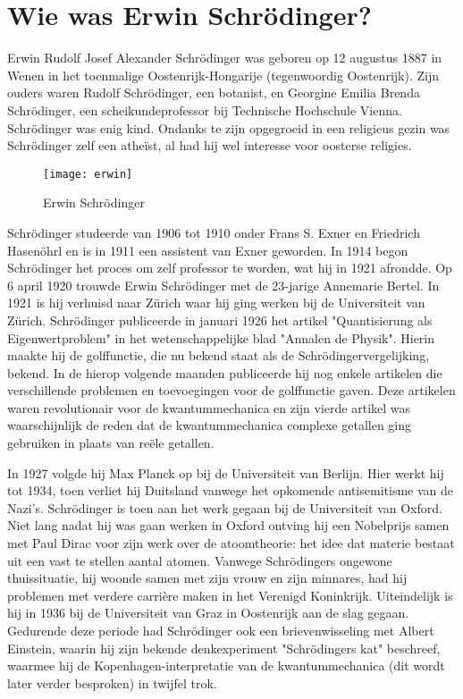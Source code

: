 \documentclass[11pt,fleqn]{book} %
\begin{document}
\section{Wie was Erwin Schrödinger?}
Erwin Rudolf Josef Alexander Schrödinger was geboren op 12 augustus 1887 in Wenen in het toenmalige Oostenrijk-Hongarije (tegenwoordig Oostenrijk). Zijn ouders waren Rudolf Schrödinger, een botanist, en Georgine Emilia Brenda Schrödinger, een scheikundeprofessor bij Technische Hochschule Vienna. Schrödinger was enig kind. Ondanks te zijn opgegroeid in een religieus gezin was Schrödinger zelf een atheïst, al had hij wel interesse voor oosterse religies.
\begin{figure}[h]
	\centering\texttt{[image: erwin]}
	\caption{Erwin Schrödinger}
	\label{fig:erwin}
\end{figure}
Schrödinger studeerde van 1906 tot 1910 onder Frans S. Exner en Friedrich Hasenöhrl en is in 1911 een assistent van Exner geworden. In 1914 begon Schrödinger het proces om zelf professor te worden, wat hij in 1921 afrondde. Op 6 april 1920 trouwde Erwin Schrödinger met de 23-jarige Annemarie Bertel. In 1921 is hij verhuisd naar Zürich waar hij ging werken bij de Universiteit van Zürich. 
Schrödinger publiceerde in januari 1926 het artikel "Quantisierung als Eigenwertproblem" in het wetenschappelijke blad "Annalen de Physik". Hierin maakte hij de golffunctie, die nu bekend staat als de Schrödingervergelijking, bekend. In de hierop volgende maanden publiceerde hij nog enkele artikelen die verschillende problemen en toevoegingen voor de golffunctie gaven. Deze artikelen waren revolutionair voor de kwantummechanica en zijn vierde artikel was waarschijnlijk de reden dat de kwantummechanica complexe getallen ging gebruiken in plaats van reële getallen.

In 1927 volgde hij Max Planck op bij de Universiteit van Berlijn. Hier werkt hij tot 1934, toen verliet hij Duitsland vanwege het opkomende antisemitisme van de Nazi's. Schrödinger is toen aan het werk gegaan bij de Universiteit van Oxford. Niet lang nadat hij was gaan werken in Oxford ontving hij een Nobelprijs samen met Paul Dirac voor zijn werk over de atoomtheorie: het idee dat materie bestaat uit een vast te stellen aantal atomen. Vanwege Schrödingers ongewone thuissituatie, hij woonde samen met zijn vrouw en zijn minnares, had hij problemen met verdere carrière maken in het Verenigd Koninkrijk. Uiteindelijk is hij in 1936 bij de Universiteit van Graz in Oostenrijk aan de slag gegaan. Gedurende deze periode had Schrödinger ook een brievenwisseling met Albert Einstein, waarin hij zijn bekende denkexperiment "Schrödingers kat" beschreef, waarmee hij de Kopenhagen-interpretatie van de kwantummechanica (dit wordt later verder besproken) in twijfel trok.
\end{document}

